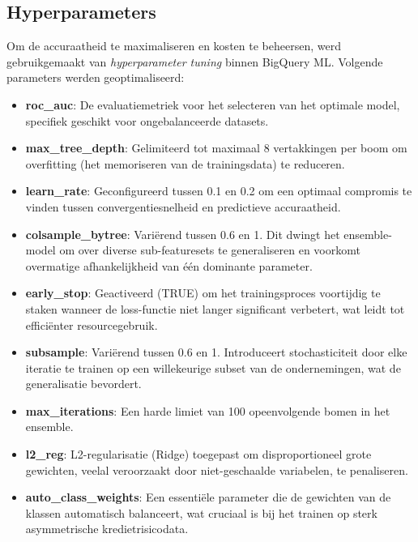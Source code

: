 \subsection{Hyperparameters}
Om de accuraatheid te maximaliseren en kosten te beheersen, werd gebruikgemaakt van \textit{hyperparameter tuning} binnen BigQuery ML. Volgende parameters werden geoptimaliseerd:

\begin{itemize}
    \item \textbf{roc\_auc}: De evaluatiemetriek voor het selecteren van het optimale model, specifiek geschikt voor ongebalanceerde datasets.
    \item \textbf{max\_tree\_depth}: Gelimiteerd tot maximaal 8 vertakkingen per boom om overfitting (het memoriseren van de trainingsdata) te reduceren.
    \item \textbf{learn\_rate}: Geconfigureerd tussen 0.1 en 0.2 om een optimaal compromis te vinden tussen convergentiesnelheid en predictieve accuraatheid.
    \item \textbf{colsample\_bytree}: Variërend tussen 0.6 en 1. Dit dwingt het ensemble-model om over diverse sub-featuresets te generaliseren en voorkomt overmatige afhankelijkheid van één dominante parameter.
    \item \textbf{early\_stop}: Geactiveerd (TRUE) om het trainingsproces voortijdig te staken wanneer de loss-functie niet langer significant verbetert, wat leidt tot efficiënter resourcegebruik.
    \item \textbf{subsample}: Variërend tussen 0.6 en 1. Introduceert stochasticiteit door elke iteratie te trainen op een willekeurige subset van de ondernemingen, wat de generalisatie bevordert.
    \item \textbf{max\_iterations}: Een harde limiet van 100 opeenvolgende bomen in het ensemble.
    \item \textbf{l2\_reg}: L2-regularisatie (Ridge) toegepast om disproportioneel grote gewichten, veelal veroorzaakt door niet-geschaalde variabelen, te penaliseren.
    \item \textbf{auto\_class\_weights}: Een essentiële parameter die de gewichten van de klassen automatisch balanceert, wat cruciaal is bij het trainen op sterk asymmetrische kredietrisicodata.
\end{itemize}

